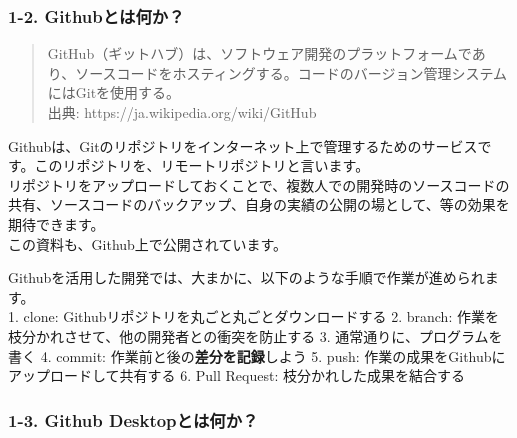 \begin{Shaded}
\begin{Highlighting}[]

\end{Highlighting}
\end{Shaded}

\subsubsection{1-2.
Githubとは何か？}\label{githubux3068ux306fux4f55ux304b}

\begin{quote}
GitHub（ギットハブ）は、ソフトウェア開発のプラットフォームであり、ソースコードをホスティングする。コードのバージョン管理システムにはGitを使用する。\\
出典: https://ja.wikipedia.org/wiki/GitHub
\end{quote}

Githubは、Gitのリポジトリをインターネット上で管理するためのサービスです。このリポジトリを、リモートリポジトリと言います。\\
リポジトリをアップロードしておくことで、複数人での開発時のソースコードの共有、ソースコードのバックアップ、自身の実績の公開の場として、等の効果を期待できます。\\
この資料も、Github上で公開されています。

Githubを活用した開発では、大まかに、以下のような手順で作業が進められます。\\
1. clone: Githubリポジトリを丸ごと丸ごとダウンロードする 2. branch:
作業を枝分かれさせて、他の開発者との衝突を防止する 3.
通常通りに、プログラムを書く 4. commit:
作業前と後の\textbf{差分を記録}しよう 5. push:
作業の成果をGithubにアップロードして共有する 6. Pull Request:
枝分かれした成果を結合する

\subsubsection{1-3. Github
Desktopとは何か？}\label{github-desktopux3068ux306fux4f55ux304b}

